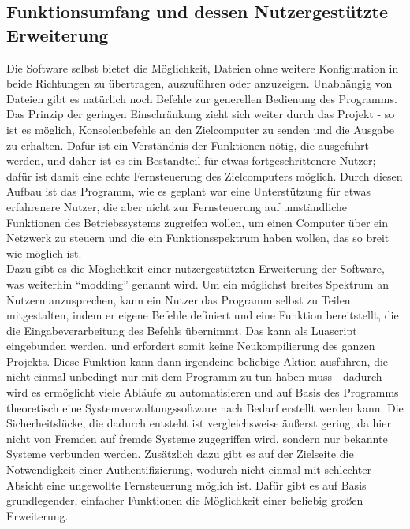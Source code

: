 \subsection{Funktionsumfang und dessen Nutzergestützte Erweiterung}
Die Software selbst bietet die Möglichkeit, Dateien ohne weitere Konfiguration in beide Richtungen zu übertragen, auszuführen oder anzuzeigen.
Unabhängig von Dateien gibt es natürlich noch Befehle zur generellen Bedienung des Programms.
Das Prinzip der geringen Einschränkung zieht sich weiter durch das Projekt - so ist es möglich, Konsolenbefehle an den Zielcomputer zu senden und die Ausgabe zu erhalten.
Dafür ist ein Verständnis der Funktionen nötig, die ausgeführt werden, und daher ist es ein Bestandteil für etwas fortgeschrittenere Nutzer; dafür ist damit eine echte Fernsteuerung des Zielcomputers möglich.
Durch diesen Aufbau ist das Programm, wie es geplant war eine Unterstützung für etwas erfahrenere Nutzer, die aber nicht zur Fernsteuerung auf umständliche Funktionen des Betriebssystems zugreifen wollen, um einen Computer über ein Netzwerk zu steuern und die ein Funktionsspektrum haben wollen, das so breit wie möglich ist.\\
Dazu gibt es die Möglichkeit einer nutzergestützten Erweiterung der Software, was weiterhin "`modding"' genannt wird.
Um ein möglichst breites Spektrum an Nutzern anzusprechen, kann ein Nutzer das Programm selbst zu Teilen mitgestalten, indem er eigene Befehle definiert und eine Funktion bereitstellt, die die Eingabeverarbeitung des Befehls übernimmt.
Das kann als Luascript eingebunden werden, und erfordert somit keine Neukompilierung des ganzen Projekts.
Diese Funktion kann dann irgendeine beliebige Aktion ausführen, die nicht einmal unbedingt nur mit dem Programm zu tun haben muss - dadurch wird es ermöglicht viele Abläufe zu automatisieren und auf Basis des Programms theoretisch eine Systemverwaltungssoftware nach Bedarf erstellt werden kann.
Die Sicherheitslücke, die dadurch entsteht ist vergleichsweise äußerst gering, da hier nicht von Fremden auf fremde Systeme zugegriffen wird, sondern nur bekannte Systeme verbunden werden.
Zusätzlich dazu gibt es auf der Zielseite die Notwendigkeit einer Authentifizierung, wodurch nicht einmal mit schlechter Absicht eine ungewollte Fernsteuerung möglich ist.
Dafür gibt es auf Basis grundlegender, einfacher Funktionen die Möglichkeit einer beliebig großen Erweiterung.
